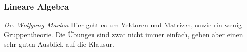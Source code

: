 \subsubsection{Lineare Algebra}
	\textit{Dr. Wolfgang Marten}
	Hier geht es um Vektoren und Matrizen, sowie ein wenig Gruppentheorie. Die Übungen sind zwar nicht immer einfach, geben aber einen sehr guten Ausblick auf die Klausur.
